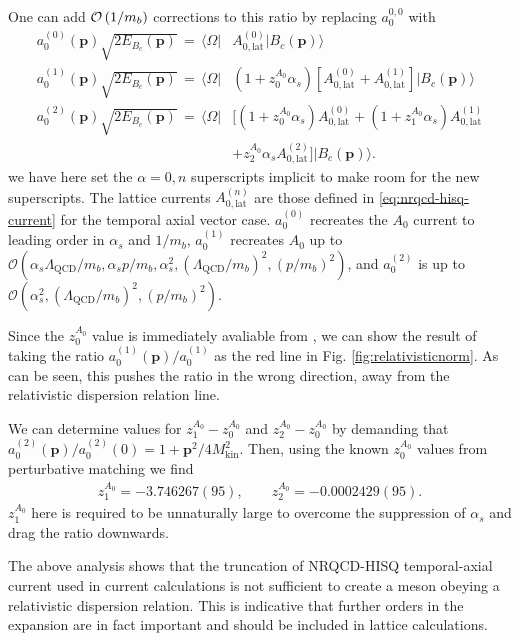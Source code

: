 One can add $\mathcal{O}\left( 1/m_b \right)$ corrections to this ratio by replacing $a_0^{0,0}$ with
\begin{align}
  \nonumber
  \label{eq:a_0corrections}
  a_0^{(0)}({\textbf{p}}) \sqrt{2E_{B_c}({\textbf{p}})} \,=\, \langle \Omega |& A_{0,\text{lat}}^{(0)} | B_c  ({\textbf{p}}) \rangle \\
  \nonumber
  a_0^{(1)}({\textbf{p}}) \sqrt{2E_{B_c}({\textbf{p}})} \,=\, \langle \Omega |& (1+z^{A_0}_0 \alpha_s ) \left[A_{0,\text{lat}}^{(0)} +  A_{0,\text{lat}}^{(1)} \right] | B_c({\textbf{p}}) \rangle \\
  \nonumber
  a_0^{(2)}({\textbf{p}}) \sqrt{2E_{B_c}({\textbf{p}})} \,=\, \langle \Omega |& \big[ (1+z^{A_0}_0 \alpha_s ) A_{0,\text{lat}}^{(0)} + (1 + z^{A_0}_1\alpha_s) A_{0,\text{lat}}^{(1)} \\ &+ z^{A_0}_2\alpha_s A_{0,\text{lat}}^{(2)}  \big] | B_c({\textbf{p}})\rangle.
\end{align}
we have here set the $\alpha=0,n$ superscripts implicit to make room for the new superscripts. The lattice currents $A_{0,\text{lat}}^{(n)}$ are those defined in \ref{eq:nrqcd-hisq-current} for the temporal axial vector case. $a_0^{(0)}$ recreates the $A_0$ current to leading order in $\alpha_s$ and $1/m_b$, $a_0^{(1)}$ recreates $A_0$ up to $\mathcal{O}( \alpha_s \Lambda_{\text{QCD}} / m_b, \alpha_s p/m_b,  \alpha_s^2, (\Lambda_{\text{QCD}}/m_b)^2, (p/m_b)^2 )$, and $a_0^{(2)}$ is up to $\mathcal{O}( \alpha_s^2, (\Lambda_{\text{QCD}}/m_b)^2, (p/m_b)^2 )$.

Since the $z_0^{A_0}$ value is immediately avaliable from \cite{Monahan:2012dq}, we can show the result of taking the ratio $a_0^{(1)}({\textbf{p}})/a_0^{(1)}$ as the red line in Fig. \ref{fig:relativisticnorm}. As can be seen, this pushes the ratio in the wrong direction, away from the relativistic dispersion relation line.

  We can determine values for $z_1^{A_0}-z_0^{A_0}$ and $z_2^{A_0}-z_0^{A_0}$ by demanding that $a^{(2)}_0({\textbf{p}})/a^{(2)}_0(0) = 1 + {\textbf{p}}^2/4M_{\text{kin}}^2$. Then, using the known $z_0^{A_0}$ values from perturbative matching we find
  \begin{align}
    z_1^{A_0} = -3.746267(95),\quad\quad z_2^{A_0} = -0.0002429(95).
  \end{align}
  $z_1^{A_0}$ here is required to be unnaturally large to overcome the suppression of $\alpha_s$ and drag the ratio downwards. 

The above analysis shows that the truncation of NRQCD-HISQ temporal-axial current used in current calculations is not sufficient to create a meson obeying a relativistic dispersion relation. This is indicative that further orders in the expansion are in fact important and should be included in lattice calculations. 

